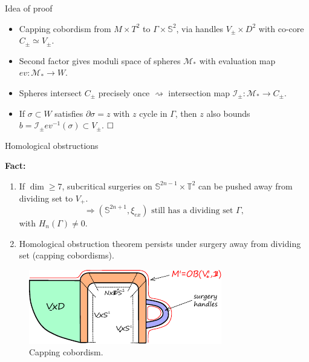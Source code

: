 \documentclass{beamer}
\begin{document}
\begin{frame}{Idea of proof}
    \begin{itemize}
        \item Capping cobordism from $M\times T^2$ to $\Gamma\times \mathbb S^2$, via handles $V_\pm \times D^2$ with co-core $C_\pm \simeq V_\pm$. 
        \item Second factor gives moduli space of spheres $\mathcal M_*$ with evaluation map $ev: \mathcal M_*\rightarrow W$. 
        \item Spheres intersect $C_\pm$ precisely once $\rightsquigarrow$ intersection map $\mathcal I_\pm:\mathcal M_*\rightarrow C_\pm$.
        \item If $\sigma \subset W$ satisfies $\partial \sigma=z$ with $z$ cycle in $\Gamma$, 
        then $z$ also bounds $b=\mathcal I_\pm ev^{-1}(\sigma) \subset V_\pm$. $\hfill\square$ 
        
    \end{itemize}
\end{frame}
    
\begin{frame}{Homological obstructions}

\textbf{Fact:} 

\begin{enumerate}
    \item If $\dim \geq 7$, subcritical surgeries on $\mathbb S^{2n-1}\times \mathbb T^2$ can be pushed away from dividing set to $V_+$.
$$
\Rightarrow (\mathbb S^{2n+1},\xi_{ex}) \mbox{ still has a dividing set } \Gamma,
$$
with $H_n(\Gamma)\neq 0$.

\pause 
\item Homological obstruction theorem persists under surgery away from dividing set (capping cobordisms).
\end{enumerate}


\begin{figure}
    \centering
    \includegraphics[width=0.7\linewidth]{blowdown_handle.pdf}
    \caption{Capping cobordism.}
    \label{fig:capping_cobordism}
\end{figure}

\end{frame}
\end{document}
